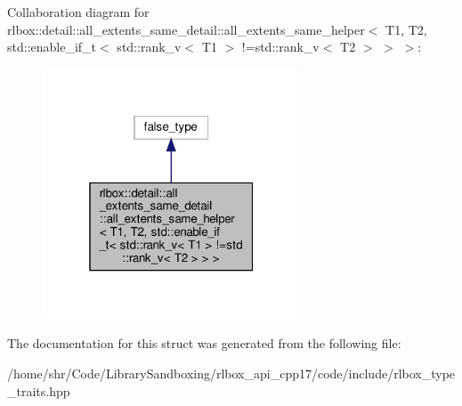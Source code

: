 Collaboration diagram for rlbox\+:\+:detail\+:\+:all\+\_\+extents\+\_\+same\+\_\+detail\+:\+:all\+\_\+extents\+\_\+same\+\_\+helper$<$ T1, T2, std\+:\+:enable\+\_\+if\+\_\+t$<$ std\+:\+:rank\+\_\+v$<$ T1 $>$ !=std\+:\+:rank\+\_\+v$<$ T2 $>$ $>$ $>$\+:\nopagebreak
\begin{figure}[H]
\begin{center}
\leavevmode
\includegraphics[width=217pt]{structrlbox_1_1detail_1_1all__extents__same__detail_1_1all__extents__same__helper_3_01T1_00_01T27e54e2c89f197b9da103ece8d1864ac7}
\end{center}
\end{figure}


The documentation for this struct was generated from the following file\+:\begin{DoxyCompactItemize}
\item 
/home/shr/\+Code/\+Library\+Sandboxing/rlbox\+\_\+api\+\_\+cpp17/code/include/rlbox\+\_\+type\+\_\+traits.\+hpp\end{DoxyCompactItemize}
